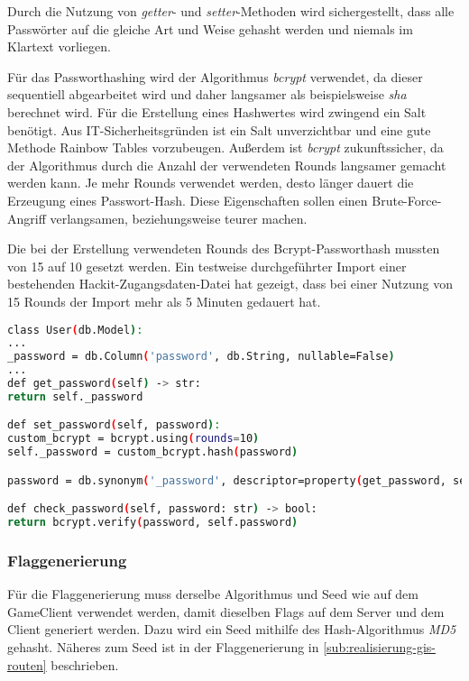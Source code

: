 Durch die Nutzung von \textit{getter}- und \textit{setter}-Methoden wird sichergestellt, dass alle Passwörter auf die gleiche Art und Weise gehasht werden und niemals im Klartext vorliegen.

Für das Passworthashing wird der Algorithmus \textit{bcrypt} verwendet, da dieser sequentiell abgearbeitet wird und daher langsamer als beispielsweise  \textit{sha} berechnet wird. Für die Erstellung eines Hashwertes wird zwingend ein Salt benötigt. Aus IT-Sicherheitsgründen ist ein Salt unverzichtbar und eine gute Methode Rainbow Tables vorzubeugen. Außerdem ist \textit{bcrypt} zukunftssicher, da der Algorithmus durch die Anzahl der verwendeten Rounds langsamer gemacht werden kann. Je mehr Rounds verwendet werden, desto länger dauert die Erzeugung eines Passwort-Hash. Diese Eigenschaften sollen einen Brute-Force-Angriff verlangsamen, beziehungsweise teurer machen. \cite{ariasHashingActionUnderstanding2018}

Die bei der Erstellung verwendeten Rounds des Bcrypt-Passworthash mussten von 15 auf 10 gesetzt werden. Ein testweise durchgeführter Import einer bestehenden Hackit-Zugangsdaten-Datei hat gezeigt, dass bei einer Nutzung von 15 Rounds der Import mehr als 5 Minuten gedauert hat.

\begin{lstlisting}[language=bash, frame=single, caption={GIS Passwort des Accounts}, captionpos=b, label={lst:gis-orm-user-pw-hash}]
class User(db.Model):
...
_password = db.Column('password', db.String, nullable=False)
...
def get_password(self) -> str:
return self._password

def set_password(self, password):
custom_bcrypt = bcrypt.using(rounds=10)
self._password = custom_bcrypt.hash(password)

password = db.synonym('_password', descriptor=property(get_password, set_password))

def check_password(self, password: str) -> bool:
return bcrypt.verify(password, self.password)
\end{lstlisting}

\subsubsection{Flaggenerierung}\label{subsub:realisierung-gis-flag-hash}
Für die Flaggenerierung muss derselbe Algorithmus und Seed wie auf dem GameClient verwendet werden, damit dieselben Flags auf dem Server und dem Client generiert werden. Dazu wird ein Seed mithilfe des Hash-Algorithmus \textit{MD5} gehasht. Näheres zum Seed ist in der Flaggenerierung in \autoref{sub:realisierung-gis-routen} beschrieben. 

